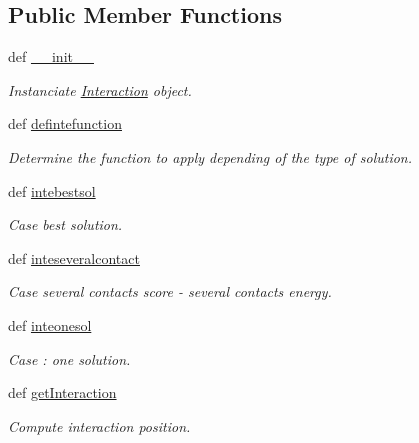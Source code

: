 \subsection*{\-Public \-Member \-Functions}
\begin{DoxyCompactItemize}
\item 
def \hyperlink{classirna_1_1iRNA__stat_1_1Interaction_1_1Interaction_a50255907cb4c107839a3173c22719c8a}{\-\_\-\-\_\-init\-\_\-\-\_\-}
\begin{DoxyCompactList}\small\item\em \-Instanciate \hyperlink{classirna_1_1iRNA__stat_1_1Interaction_1_1Interaction}{\-Interaction} object. \end{DoxyCompactList}\item 
def \hyperlink{classirna_1_1iRNA__stat_1_1Interaction_1_1Interaction_a4e90bb522d64ac7d8baa69e2490713b0}{defintefunction}
\begin{DoxyCompactList}\small\item\em \-Determine the function to apply depending of the type of solution. \end{DoxyCompactList}\item 
def \hyperlink{classirna_1_1iRNA__stat_1_1Interaction_1_1Interaction_a29a98cd4c5b41e0d30b84567285dd88f}{intebestsol}
\begin{DoxyCompactList}\small\item\em \-Case best solution. \end{DoxyCompactList}\item 
def \hyperlink{classirna_1_1iRNA__stat_1_1Interaction_1_1Interaction_ad21963eaf3df3251f4fb7758bb12c341}{inteseveralcontact}
\begin{DoxyCompactList}\small\item\em \-Case several contacts score -\/ several contacts energy. \end{DoxyCompactList}\item 
def \hyperlink{classirna_1_1iRNA__stat_1_1Interaction_1_1Interaction_ab18fcaf3e8eb39ee6b7f662725114af9}{inteonesol}
\begin{DoxyCompactList}\small\item\em \-Case \-: one solution. \end{DoxyCompactList}\item 
def \hyperlink{classirna_1_1iRNA__stat_1_1Interaction_1_1Interaction_a7bcc26a00e4706a9c2563e6be61b2e53}{get\-Interaction}
\begin{DoxyCompactList}\small\item\em \-Compute interaction position. \end{DoxyCompactList}\item 

\end{DoxyCompactItemize}

